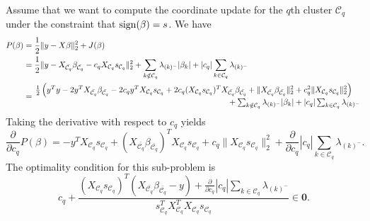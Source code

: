 Assume that we want to compute the coordinate update for the \(q\)th cluster
\(\mathcal{C}_q\) under the constraint that \(\operatorname{sign}(\beta) = s\).
We have
\[
  \begin{aligned}
    P(\beta) & = \frac{1}{2} \lVert y - X\beta\rVert_2^2 + J(\beta)                                                                                                                                                                                                                        \\
             & = \frac{1}{2} \lVert y - X_{\bar{\mathcal{C}_q}} \beta_{\bar{\mathcal{C}_q}} - c_q X_{\mathcal{C}_q} s_{\mathcal{C}_q} \rVert_2^2 + \sum_{k \notin {\mathcal{C}_q}} \lambda_{(k)^-}|\beta_k| + |c_q|\sum_{k \in {\mathcal{C}_q}} \lambda_{(k)^-}                                                                                                                            \\
             & = \splitfrac{\frac{1}{2} \left(y^Ty - 2y^T X_{\bar{\mathcal{C}_q}} \beta_{\bar{\mathcal{C}_q}} - 2 c_q y^T X_{\mathcal{C}_q} s_{\mathcal{C}_q} + 2 c_q (X_{\mathcal{C}_q} s_{\mathcal{C}_q})^T X_{\bar{\mathcal{C}_q}} \beta_{\bar{\mathcal{C}_q}} + \lVert X_{\bar{\mathcal{C}_q}} \beta_{\bar{\mathcal{C}_q}} \rVert_2^2 + c_q^2 \lVert X_{\mathcal{C}_q} s_{\mathcal{C}_q}\rVert_2^2 \right)}{+ \sum_{k \notin {\mathcal{C}_q}} \lambda_{(k)^-}|\beta_k| + |c_q|\sum_{k \in {\mathcal{C}_q}} \lambda_{(k)^-}} \\
  \end{aligned}
\]
Taking the derivative with respect to \(c_q\) yields
\[
  \frac{\partial}{\partial c_q}P(\beta) = -y^T X_{\mathcal{C}_q} s_{\mathcal{C}_q} + (X_{\bar{\mathcal{C}_q}} \beta_{\bar{\mathcal{C}_q}})^T{X_{\mathcal{C}_q} s_{\mathcal{C}_q}} + c_q \lVert X_{\mathcal{C}_q} s_{\mathcal{C}_q} \rVert_2^2 + \frac{\partial}{\partial c_q}|c_q|\sum_{k \in {\mathcal{C}_q}} \lambda_{(k)^-}.
\]
The optimality condition for this sub-problem is
\[
  c_q + \frac{(X_{\mathcal{C}_q} s_{\mathcal{C}_q})^T\left( X_{\bar{\mathcal{C}_q}}\beta_{\bar{\mathcal{C}_q}} - y \right) + \frac{\partial}{\partial c_q}|c_q|\sum_{k \in {\mathcal{C}_q}} \lambda_{(k)^-}}{s_{\mathcal{C}_q}^T X_{{\mathcal{C}_q}}^T X_{\mathcal{C}_q} s_{\mathcal{C}_q}} \in \boldsymbol{0}.
\]

